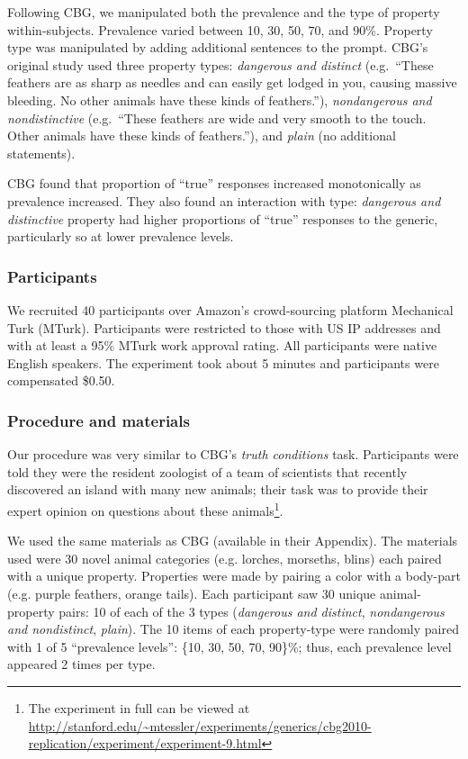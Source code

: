 \documentclass[10pt,letterpaper]{article}
\begin{document}
Following CBG, we manipulated both the prevalence and the type of property within-subjects. Prevalence varied between 10, 30, 50, 70, and 90\%. Property type was manipulated by adding additional sentences to the prompt. CBG's original study used three property types: \emph{dangerous and distinct} (e.g.~``These feathers are as sharp as needles and can easily get lodged in you, causing massive bleeding. No other animals have these kinds of feathers.''), \emph{nondangerous and nondistinctive} (e.g.~``These feathers are wide and very smooth to the touch. Other animals have these kinds of feathers.''), and \emph{plain} (no additional statements). 

CBG found that proportion of ``true'' responses increased monotonically as prevalence increased. They also found an interaction with type: \emph{dangerous and distinctive} property had higher proportions of ``true'' responses to the generic, particularly so at lower prevalence levels. 

\subsubsection{Participants}

We recruited 40 participants over Amazon's crowd-sourcing platform Mechanical Turk (MTurk).  Participants were restricted to those with US IP addresses and with at least a 95\% MTurk work approval rating. All participants were native English speakers. The experiment took about 5 minutes and participants were compensated \$0.50.

\subsubsection{Procedure and materials}

Our procedure was very similar to CBG's \emph{truth conditions} task. Participants were told they were the resident zoologist of a team of scientists that recently discovered an island with many new animals; their task was to provide their expert opinion on questions about these animals\footnote{The experiment in full can be viewed at \url{http://stanford.edu/~mtessler/experiments/generics/cbg2010-replication/experiment/experiment-9.html}}. 

 
We used the same materials as CBG (available in their Appendix). The materials used were 30 novel animal categories (e.g. lorches, morseths, blins) each paired with a unique property. Properties were made by pairing a color with a body-part (e.g. purple feathers, orange tails). Each participant saw 30 unique animal-property pairs: 10 of each of the 3 types (\emph{dangerous and distinct}, \emph{nondangerous and nondistinct}, \emph{plain}). The 10 items of each property-type were randomly paired with 1 of 5 ``prevalence levels'': \{10, 30, 50, 70, 90\}\%; thus, each prevalence level appeared 2 times per type. 
\end{document}
